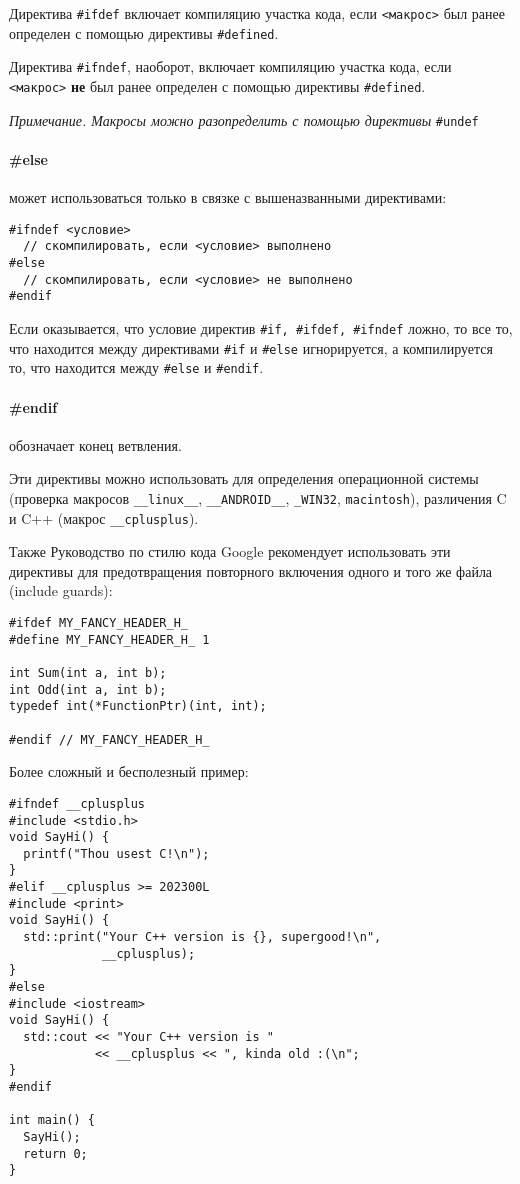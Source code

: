 \documentclass[14pt, a4paper]{extarticle}
\begin{document}
Директива \verb|#ifdef| включает компиляцию участка кода, если \verb|<макрос>| был ранее определен с помощью директивы \verb|#defined|.

Директива \verb|#ifndef|, наоборот, включает компиляцию участка кода, если \verb|<макрос>| \textbf{не} был ранее определен
с помощью директивы \verb|#defined|.

{\small \textit{Примечание. Макросы можно разопределить с помощью директивы} \verb|#undef| }

\paragraph{\#else} может использоваться только в связке с вышеназванными директивами:
\begin{verbatim}
#ifndef <условие>
  // скомпилировать, если <условие> выполнено
#else
  // скомпилировать, если <условие> не выполнено
#endif
\end{verbatim}

Если оказывается, что условие директив \verb|#if, #ifdef, #ifndef| ложно, то все то, что находится между директивами \verb|#if|
и \verb|#else| игнорируется, а компилируется то, что находится между \verb|#else| и \verb|#endif|.

\paragraph{\#endif} обозначает конец ветвления.

Эти директивы можно использовать для определения операционной системы (проверка макросов \verb|__linux__|, \verb|__ANDROID__|,
\verb|_WIN32|, \verb|macintosh|),
различения C и C++ (макрос \verb|__cplusplus|).

Также Руководство по стилю кода Google рекомендует использовать эти директивы для предотвращения повторного включения одного
и того же файла (include guards):
\begin{verbatim}
#ifdef MY_FANCY_HEADER_H_
#define MY_FANCY_HEADER_H_ 1

int Sum(int a, int b);
int Odd(int a, int b);
typedef int(*FunctionPtr)(int, int);

#endif // MY_FANCY_HEADER_H_
\end{verbatim}

Более сложный и бесполезный пример:
\begin{verbatim}
#ifndef __cplusplus
#include <stdio.h>
void SayHi() {
  printf("Thou usest C!\n");
}
#elif __cplusplus >= 202300L
#include <print>
void SayHi() {
  std::print("Your C++ version is {}, supergood!\n",
             __cplusplus);
}
#else
#include <iostream>
void SayHi() {
  std::cout << "Your C++ version is "
            << __cplusplus << ", kinda old :(\n";
}
#endif

int main() {
  SayHi();
  return 0;
}
\end{verbatim}
\end{document}
